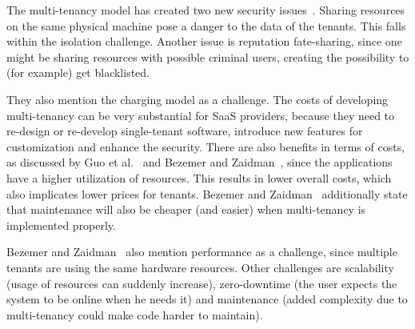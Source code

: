 The multi-tenancy model has created two new security issues~\cite{dillon2010cloud}. Sharing resources on the same physical machine pose a danger to the data of the tenants. This falls within the isolation challenge. Another issue is reputation fate-sharing, since one might be sharing resources with possible criminal users, creating the possibility to (for example) get blacklisted.

They also mention the charging model as a challenge. The costs of developing multi-tenancy can be very substantial for \ac{SaaS} providers, because they need to re-design or re-develop single-tenant software, introduce new features for customization and enhance the security.
There are also benefits in terms of costs, as discussed by Guo et al.~\cite{guo2007framework} and Bezemer and Zaidman~\cite{bezemer2010multi}, since the applications have a higher utilization of resources. This results in lower overall costs, which also implicates lower prices for tenants. Bezemer and Zaidman~\cite{bezemer2010multi} additionally state that maintenance will also be cheaper (and easier) when multi-tenancy is implemented properly.

Bezemer and Zaidman~\cite{bezemer2010multi} also mention performance as a challenge, since multiple tenants are using the same hardware resources. Other challenges are scalability (usage of resources can suddenly increase), zero-downtime (the user expects the system to be online when he needs it) and maintenance (added complexity due to multi-tenancy could make code harder to maintain).